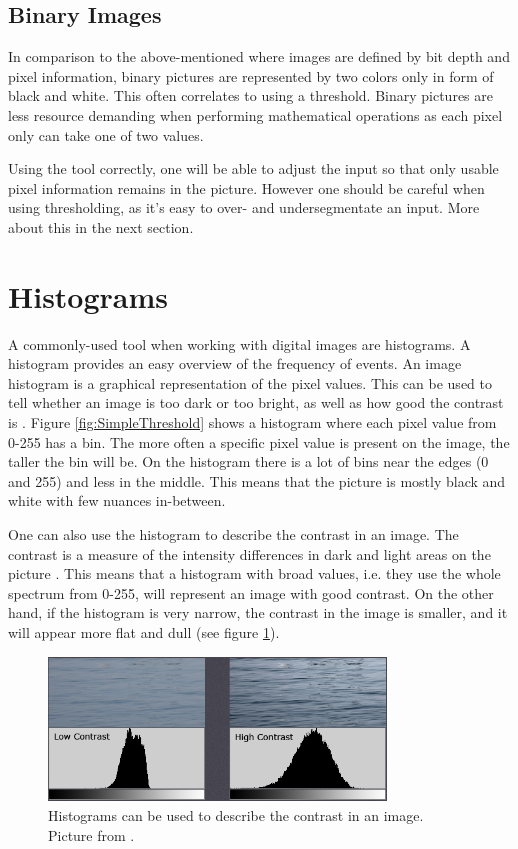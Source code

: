 \subsection{Binary Images}
In comparison to the above-mentioned where images are defined by bit depth and pixel information, binary pictures are represented by two colors only in form of black and white. This often correlates to using a threshold. Binary pictures are less resource demanding when performing mathematical operations as each pixel only can take one of two values.

Using the tool correctly, one will be able to adjust the input so that only usable pixel information remains in the picture. However one should be careful when using thresholding, as it's easy to over- and undersegmentate an input. More about this in the next section.

\section{Histograms}
A commonly-used tool when working with digital images are histograms. A histogram provides an easy overview of the frequency of events. An image histogram is a graphical representation of the pixel values. This can be used to tell whether an image is too dark or too bright, as well as how good the contrast is \citep{ip_book}. Figure \ref{fig:SimpleThreshold} shows a histogram where each pixel value from 0-255 has a bin. The more often a specific pixel value is present on the image, the taller the bin will be. On the histogram there is a lot of bins near the edges (0 and 255) and less in the middle. This means that the picture is mostly black and white with few nuances in-between.

One can also use the histogram to describe the contrast in an image. The contrast is a measure of the intensity differences in dark and light areas on the picture \citep{histogram}. This means that a histogram with broad values, i.e. they use the whole spectrum from 0-255, will represent an image with good contrast. On the other hand, if the histogram is very narrow, the contrast in the image is smaller, and it will appear more flat and dull (see figure \ref{fig:histogram_contrast}).

\begin{figure}[htbp]
\centering
\includegraphics[width=0.80\textwidth]{Pictures/Theory/hisogram_contrast.png}
\caption{Histograms can be used to describe the contrast in an image. Picture from \citep{histogram}.}
\label{fig:histogram_contrast}
\end{figure}

